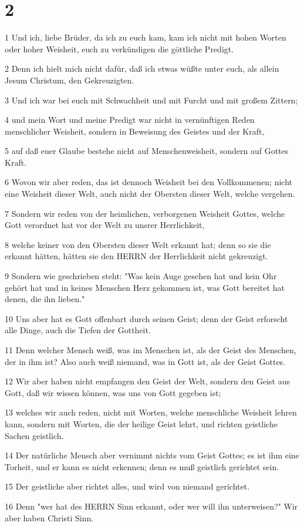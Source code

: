 \chapter{2}

\par 1 Und ich, liebe Brüder, da ich zu euch kam, kam ich nicht mit hohen Worten oder hoher Weisheit, euch zu verkündigen die göttliche Predigt.
\par 2 Denn ich hielt mich nicht dafür, daß ich etwas wüßte unter euch, als allein Jesum Christum, den Gekreuzigten.
\par 3 Und ich war bei euch mit Schwachheit und mit Furcht und mit großem Zittern;
\par 4 und mein Wort und meine Predigt war nicht in vernünftigen Reden menschlicher Weisheit, sondern in Beweisung des Geistes und der Kraft,
\par 5 auf daß euer Glaube bestehe nicht auf Menschenweisheit, sondern auf Gottes Kraft.
\par 6 Wovon wir aber reden, das ist dennoch Weisheit bei den Vollkommenen; nicht eine Weisheit dieser Welt, auch nicht der Obersten dieser Welt, welche vergehen.
\par 7 Sondern wir reden von der heimlichen, verborgenen Weisheit Gottes, welche Gott verordnet hat vor der Welt zu unsrer Herrlichkeit,
\par 8 welche keiner von den Obersten dieser Welt erkannt hat; denn so sie die erkannt hätten, hätten sie den HERRN der Herrlichkeit nicht gekreuzigt.
\par 9 Sondern wie geschrieben steht: "Was kein Auge gesehen hat und kein Ohr gehört hat und in keines Menschen Herz gekommen ist, was Gott bereitet hat denen, die ihn lieben."
\par 10 Uns aber hat es Gott offenbart durch seinen Geist; denn der Geist erforscht alle Dinge, auch die Tiefen der Gottheit.
\par 11 Denn welcher Mensch weiß, was im Menschen ist, als der Geist des Menschen, der in ihm ist? Also auch weiß niemand, was in Gott ist, als der Geist Gottes.
\par 12 Wir aber haben nicht empfangen den Geist der Welt, sondern den Geist aus Gott, daß wir wissen können, was uns von Gott gegeben ist;
\par 13 welches wir auch reden, nicht mit Worten, welche menschliche Weisheit lehren kann, sondern mit Worten, die der heilige Geist lehrt, und richten geistliche Sachen geistlich.
\par 14 Der natürliche Mensch aber vernimmt nichts vom Geist Gottes; es ist ihm eine Torheit, und er kann es nicht erkennen; denn es muß geistlich gerichtet sein.
\par 15 Der geistliche aber richtet alles, und wird von niemand gerichtet.
\par 16 Denn "wer hat des HERRN Sinn erkannt, oder wer will ihn unterweisen?" Wir aber haben Christi Sinn.

